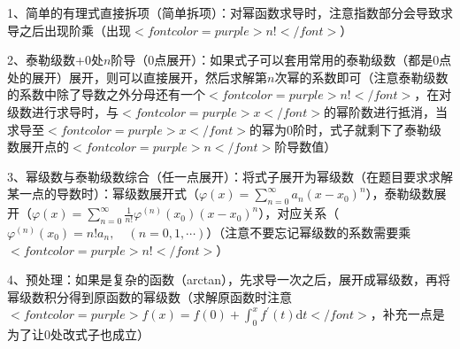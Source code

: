 1、简单的有理式直接拆项（简单拆项）：对幂函数求导时，注意指数部分会导致求导之后出现阶乘（出现$ <font color=purple>n!</font> $）

2、泰勒级数+0处$ n $阶导（0点展开）：如果式子可以套用常用的泰勒级数（都是0点处的展开）展开，则可以直接展开，然后求解第$ n $次幂的系数即可（注意泰勒级数的系数中除了导数之外分母还有一个$ <font color=purple>n!</font> $，在对级数进行求导时，与$ <font color=purple>x</font> $的幂阶数进行抵消，当求导至$ <font color=purple>x</font> $的幂为0阶时，式子就剩下了泰勒级数展开点的$ <font color=purple>n</font> $阶导数值）

3、幂级数与泰勒级数综合（任一点展开）：将式子展开为幂级数（在题目要求求解某一点的导数时）：幂级数展开式（$ \varphi(x)=\sum_{n=0}^{\infty} a_{n}\left(x-x_{0}\right)^{n} $），泰勒级数展开（$ \varphi(x)=\sum_{n=0}^{\infty} \frac{1}{n !} \varphi^{(n)}\left(x_{0}\right)\left(x-x_{0}\right)^{n} $），对应关系（$ \varphi^{(n)}\left(x_{0}\right)=n ! a_{n}, \quad(n=0,1, \cdots) $）（注意不要忘记幂级数的系数需要乘$ <font color=purple>n!</font> $）

4、预处理：如果是复杂的函数（arctan），先求导一次之后，展开成幂级数，再将幂级数积分得到原函数的幂级数（求解原函数时注意$ <font color=purple>f(x)=f(0)+\int_{0}^{x} f^{\prime}(t) \mathrm{d} t</font> $，补充一点是为了让0处改式子也成立）

